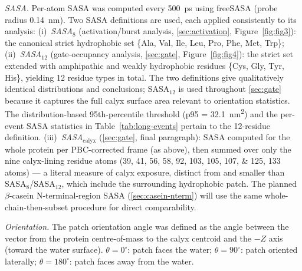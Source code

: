 \documentclass[11pt,a4paper]{article}
\begin{document}
\textit{SASA.} Per-atom SASA was computed every \SI{500}{\pico\second}
using freeSASA\citep{Mitternacht2016} (probe radius
\SI{0.14}{\nano\metre}). Two SASA definitions are used, each applied consistently to its analysis:
(i)~\textit{SASA$_8$} (activation/burst analysis, \cref{sec:activation},
Figure~\ref{fig:fig3}): the canonical strict hydrophobic set
\{Ala, Val, Ile, Leu, Pro, Phe, Met, Trp\};
(ii)~\textit{SASA$_{12}$} (gate-occupancy analysis, \cref{sec:gate},
Figure~\ref{fig:fig4}): the strict set extended with amphipathic and
weakly hydrophobic residues \{Cys, Gly, Tyr, His\}, yielding \num{12}
residue types in total. The two definitions give qualitatively identical
distributions and conclusions; SASA$_{12}$ is used throughout \cref{sec:gate}
because it captures the full calyx surface area relevant to orientation statistics. The
distribution-based 95th-percentile threshold (p95 =
\SI{32.1}{\nano\metre\squared}) and the per-event SASA statistics
in Table~\ref{tab:long-events} pertain to the \num{12}-residue
definition. (iii)~\textit{SASA$_\mathrm{calyx}$}
(\cref{sec:gate}, final paragraph): SASA computed for the whole protein
per PBC-corrected frame (as above), then summed over only the nine
calyx-lining residue atoms
(\numlist{39;41;56;58;92;103;105;107;125}, \num{133} atoms) --- a
literal measure of calyx exposure, distinct from and smaller than
SASA$_8$/SASA$_{12}$, which include the surrounding hydrophobic patch.
The planned $\beta$-casein N-terminal-region SASA
(\cref{sec:casein-nterm}) will use the same whole-chain-then-subset
procedure for direct comparability.

\textit{Orientation.} The patch orientation angle was defined as the
angle between the vector from the protein centre-of-mass to the calyx
centroid and the $-Z$ axis (toward the water surface).
$\theta = 0^\circ$: patch faces the water; $\theta = 90^\circ$: patch
oriented laterally; $\theta = 180^\circ$: patch faces away from the
water.
\end{document}
